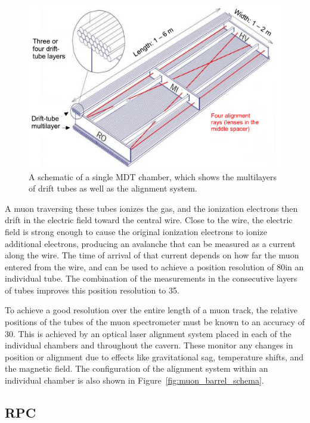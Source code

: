 \begin{figure}[hbtp]
\includegraphics[width=\fullfig]{figures/mdt_schematic.pdf}
\caption{A schematic of a single \ac{MDT} chamber, which shows the multilayers of drift tubes as well as the alignment system.}
\label{fig:mdt_schematic}
\end{figure}

A muon traversing these tubes ionizes the gas, and the ionization electrons then drift in the electric field toward the central wire.
Close to the wire, the electric field is strong enough to cause the original ionization electrons to ionize additional electrons, producing an avalanche that can be measured as a current along the wire. 
The time of arrival of that current depends on how far the muon entered from the wire, and can be used to achieve a position resolution of 80\um in an individual tube.
The combination of the measurements in the consecutive layers of tubes improves this position resolution to 35\um.

To achieve a good resolution over the entire length of a muon track, the relative positions of the tubes of the muon spectrometer must be known to an accuracy of 30\um. 
This is achieved by an optical laser alignment system placed in each of the individual chambers and throughout the cavern.
These monitor any changes in position or alignment due to effects like gravitational sag, temperature shifts, and the magnetic field.
The configuration of the alignment system within an individual chamber is also shown in Figure~\ref{fig:muon_barrel_schema}.

\subsection{\acl{RPC}}

